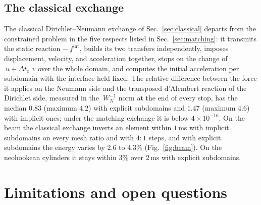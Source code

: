 \documentclass[11pt]{article}
\begin{document}
\subsection{The classical exchange}
\label{sec:baseline}

The classical Dirichlet--Neumann exchange of Sec.~\ref{sec:classical}
departs from the constrained problem in the five respects listed in
Sec.~\ref{sec:matching}: it transmits the static reaction
$-~f^{\mathrm{int}}$, builds its two transfers independently, imposes
displacement, velocity, and acceleration together, stops on the
change of $~u + \Delta t_c\, ~v$ over the whole domain, and computes the initial
acceleration per subdomain with the interface held fixed. The relative
difference between the force it applies on the Neumann side and the
transposed d'Alembert reaction of the Dirichlet side, measured in the
$~W_N^{-1}$ norm at the end of every stop, has the median $0.83$ (maximum
$4.2$) with explicit subdomains and $1.47$ (maximum $4.6$) with implicit
ones; under the matching exchange it is below $4\times 10^{-16}$. On the
beam the classical exchange inverts an element within $1$\,ms with implicit
subdomains on every mesh ratio and with $4{:}1$ steps, and with explicit
subdomains the energy varies by $2.6$ to $4.3\%$ (Fig.~\ref{fig:beam}). On
the neohookean cylinders it stays within $3\%$ over $2$\,ms with explicit
subdomains.

\section{Limitations and open questions}
\label{sec:open}
\end{document}
